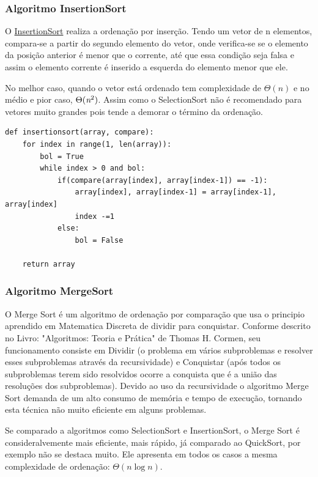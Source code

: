 \documentclass[a4paper,12pt]{scrartcl}
\begin{document}
\subsubsection{Algoritmo InsertionSort}
O \href{https://pt.wikipedia.org/wiki/Insertion_sort}{InsertionSort} realiza a ordenação por inserção. Tendo um vetor de n elementos, compara-se a partir do segundo elemento do vetor, onde verifica-se se o elemento da posição anterior é menor que o corrente, até que essa condição seja falsa e assim o elemento corrente é inserido a esquerda do elemento menor que ele.\par
No melhor caso, quando o vetor está ordenado tem complexidade de $\Theta(\textit{n})$ e no médio e pior caso, $\Theta(\textit{n}\textsuperscript{2})$. Assim como o SelectionSort não é recomendado para vetores muito grandes pois tende a demorar o término da ordenação.

\begin{lstlisting}
def insertionsort(array, compare):
    for index in range(1, len(array)):
        bol = True
        while index > 0 and bol:
            if(compare(array[index], array[index-1]) == -1):
                array[index], array[index-1] = array[index-1], array[index]
                index -=1
            else:
                bol = False
    
    return array
\end{lstlisting}

\subsubsection{Algoritmo MergeSort}
O Merge Sort é um algoritmo de ordenação por comparação que usa  o principio aprendido em Matematica Discreta de dividir para conquistar. Conforme descrito no Livro: "Algoritmos: Teoria e Prática" de Thomas H. Cormen, seu funcionamento consiste em Dividir (o problema em vários subproblemas e resolver esses subproblemas através da recursividade) e Conquistar (após todos os subproblemas terem sido resolvidos ocorre a conquista que é a união das resoluções dos subproblemas). Devido ao uso da recursividade o algoritmo Merge Sort demanda de um alto consumo de memória e tempo de execução, tornando esta técnica não muito eficiente em alguns problemas.\par

{Se comparado a algoritmos como SelectionSort e InsertionSort, o Merge Sort é consideralvemente mais eficiente, mais rápido, já comparado ao QuickSort, por exemplo não se destaca muito. Ele apresenta em todos os casos a mesma complexidade de ordenação: $ \Theta (\textit{n} \log \textit{n})$.}
\end{document}
